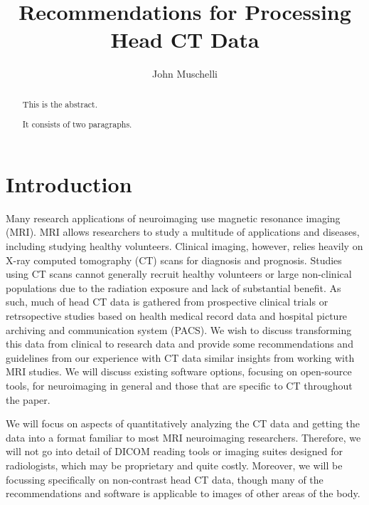 \documentclass[]{elsarticle} %
\begin{document}
\begin{frontmatter}

  \title{Recommendations for Processing Head CT Data}
    \author[JHSPH]{John Muschelli}
  
      \address[JHSPH]{Johns Hopkins Bloomberg School of Public Health, Department of
Biostatistics, 615 N Wolfe St, Baltimore, MD, 21205}
    \address[JHMI]{Johns Hopkins Hospital, Department of Neurology, 601 N Caroline St,
Baltimore, MD 21205}
    \address[BIOS]{Brain Injury Outcomes, Johns Hopkins University, 750 East Pratt Street,
Baltimore, MD 21202}
  
  \begin{abstract}
  This is the abstract.
  
  It consists of two paragraphs.
  \end{abstract}
  
 \end{frontmatter}

\hypertarget{introduction}{%
\section{Introduction}\label{introduction}}

Many research applications of neuroimaging use magnetic resonance
imaging (MRI). MRI allows researchers to study a multitude of
applications and diseases, including studying healthy volunteers.
Clinical imaging, however, relies heavily on X-ray computed tomography
(CT) scans for diagnosis and prognosis. Studies using CT scans cannot
generally recruit healthy volunteers or large non-clinical populations
due to the radiation exposure and lack of substantial benefit. As such,
much of head CT data is gathered from prospective clinical trials or
retrsopective studies based on health medical record data and hospital
picture archiving and communication system (PACS). We wish to discuss
transforming this data from clinical to research data and provide some
recommendations and guidelines from our experience with CT data similar
insights from working with MRI studies. We will discuss existing
software options, focusing on open-source tools, for neuroimaging in
general and those that are specific to CT throughout the paper.

We will focus on aspects of quantitatively analyzing the CT data and
getting the data into a format familiar to most MRI neuroimaging
researchers. Therefore, we will not go into detail of DICOM reading
tools or imaging suites designed for radiologists, which may be
proprietary and quite costly. Moreover, we will be focussing
specifically on non-contrast head CT data, though many of the
recommendations and software is applicable to images of other areas of
the body.
\end{document}
